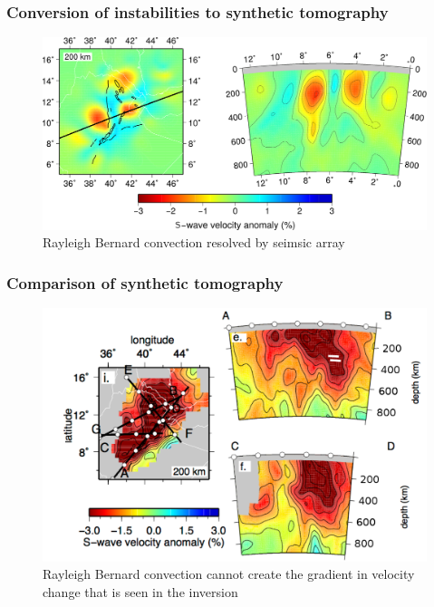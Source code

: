 \documentclass[aspectratio=169]{beamer}
\begin{document}
\begin{frame}
    \frametitle{Conversion of instabilities to synthetic tomography}
    \begin{figure}
        \includegraphics[width=0.85\paperwidth]{./figures/Newt200/output_damp.png}
        \caption{Rayleigh Bernard convection resolved by seimsic array}
    \end{figure}
\end{frame}

\begin{frame}
    \frametitle{Comparison of synthetic tomography}
    \begin{figure}
        \includegraphics[height=0.7\paperheight]{./figures/chiara1.png}
        \caption{Rayleigh Bernard convection cannot create the gradient in velocity change that is seen in the inversion}
    \end{figure}
\end{frame}
\end{document}
